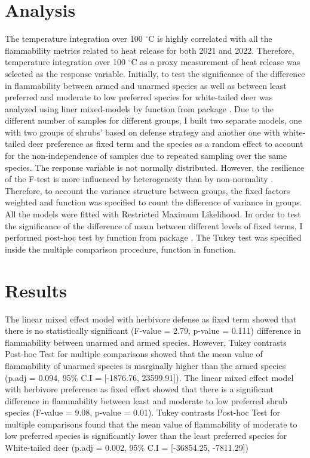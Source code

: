 \documentclass[12pt]{report}
\begin{document}
\section{Analysis}
The temperature integration over 100 $^{\circ}$C is highly correlated with all the flammability metrics related to heat release for both 2021 and 2022. Therefore, temperature integration over 100 $^{\circ}$C as a proxy measurement of heat release was selected as the response variable. Initially, to test the significance of the difference in flammability between armed and unarmed species as well as between least preferred and moderate to low preferred species for white-tailed deer was analyzed using liner mixed-models by  function from  package \citep{pinheiro2017package}. Due to the different number of samples for different groups, I  built two separate models, one with two groups of shrubs' based on defense strategy and another one with white-tailed deer preference as fixed term and the species as a random effect to account for the non-independence of samples due to repeated sampling over the same species. The response variable is not normally distributed. However, the resilience of the F-test is more influenced by heterogeneity than by non-normality \citep{blanca2017non}. Therefore, to account the variance structure between groups, the fixed factors weighted and  function was specified to count the difference of variance in groups. All the models were fitted with Restricted Maximum Likelihood. In order to test the significance of the difference of mean between different levels of fixed terms, I performed post-hoc test by  function from  package \citep{hothorn2016package}. The Tukey test was specified inside the multiple comparison procedure,  function in  function.

\section{Results}

The linear mixed effect model with herbivore defense as fixed term showed that there is no statistically significant (F-value = 2.79, p-value = 0.111) difference in flammability between unarmed and armed species. However, Tukey contrasts Post-hoc Test for multiple comparisons showed that the mean value of flammability of unarmed species is marginally higher than the armed species (p.adj = 0.094, 95\% C.I = [-1876.76, 23599.91]). The linear mixed effect model with herbivore preference as fixed effect showed that there is a significant difference in flammability between least and moderate to low preferred shrub species (F-value = 9.08, p-value = 0.01). Tukey contrasts Post-hoc Test for multiple comparisons found that the mean value of flammability of moderate to low  preferred species is significantly lower than the least preferred species for White-tailed deer (p.adj = 0.002, 95\% C.I = [-36854.25, -7811.29])\\
\end{document}
